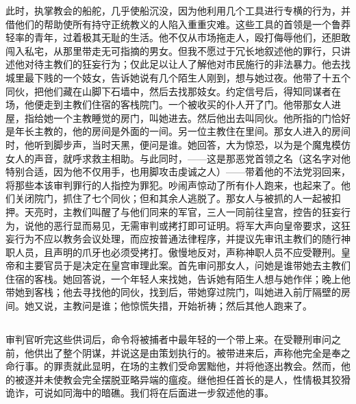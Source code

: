 此时，执掌教会的船舵，几乎使船沉没，因为他利用几个工具进行专横的行为，并借他们的帮助使所有持守正统教义的人陷入重重灾难。这些工具的首领是一个鲁莽轻率的青年，过着极其无耻的生活。他不仅从市场拖走人，殴打侮辱他们，还胆敢闯入私宅，从那里带走无可指摘的男女。但我不愿过于冗长地叙述他的罪行，只讲述他对待主教们的狂妄行为；仅此足以让人了解他对市民施行的非法暴力。他去找城里最下贱的一个妓女，告诉她说有几个陌生人刚到，想与她过夜。他带了十五个同伙，把他们藏在山脚下石墙中，然后去找那妓女。约定信号后，得知同谋者在场，他便走到主教们住宿的客栈院门。一个被收买的仆人开了门。他带那女人进屋，指给她一个主教睡觉的房门，叫她进去。然后他出去叫同伙。他所指的门恰好是年长主教的，他的房间是外面的一间。另一位主教住在里间。那女人进入的房间时，他听到脚步声，当时天黑，便问是谁。她回答，大为惊恐，以为是个魔鬼模仿女人的声音，就呼求救主相助。与此同时，——这是那恶党首领之名（这名字对他特别合适，因为他不仅用手，也用脚攻击虔诚之人）——带着他的不法党羽回来，将那些本该审判罪行的人指控为罪犯。吵闹声惊动了所有仆人跑来，也起来了。他们关闭院门，抓住了七个同伙；但和其余人逃脱了。那女人与被抓的人一起被扣押。天亮时，主教们叫醒了与他们同来的军官，三人一同前往皇宫，控告的狂妄行为，说他的恶行显而易见，无需审判或拷打即可证明。将军大声向皇帝要求，这狂妄行为不应以教务会议处理，而应按普通法律程序，并提议先审讯主教们的随行神职人员，且声明的爪牙也必须受拷打。傲慢地反对，声称神职人员不应受鞭刑。皇帝和主要官员于是决定在皇宫审理此案。首先审问那女人，问她是谁带她去主教们住宿的客栈。她回答说，一个年轻人来找她，告诉她有陌生人想与她作伴；晚上他带她到客栈；他去寻找他的同伙，找到后，带她穿过院门，叫她进入前厅隔壁的房间。她又说，主教问是谁；他惊慌失措，开始祈祷；然后其他人跑来了。\par


\subsection{}

审判官听完这些供词后，命令将被捕者中最年轻的一个带上来。在受鞭刑审问之前，他供出了整个阴谋，并说这是由策划执行的。被带进来后，声称他完全是奉之命行事。的罪责就此显明，在场的主教们受命罢黜他，并将他逐出教会。然而，他的被逐并未使教会完全摆脱亚略异端的瘟疫。继他担任首长的是人，性情极其狡猾诡诈，可说如同海中的暗礁。我们将在后面进一步叙述他的事。\par

